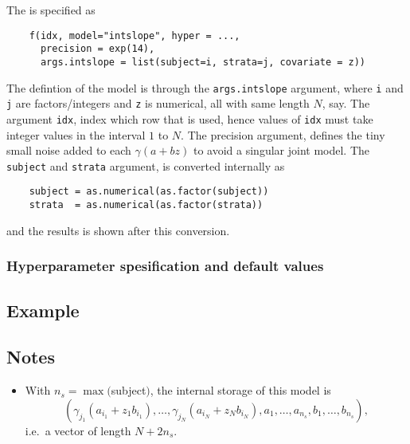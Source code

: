 \documentclass[a4paper,11pt]{article}
\begin{document}
The is specified as
\begin{verbatim}
    f(idx, model="intslope", hyper = ...,
      precision = exp(14),
      args.intslope = list(subject=i, strata=j, covariate = z))
\end{verbatim}
The defintion of the model is through the \verb|args.intslope|
argument, where \verb|i| and \verb|j| are factors/integers and
\verb|z| is numerical, all with same length $N$, say. The argument
\verb|idx|, index which row that is used, hence values of \verb|idx|
must take integer values in the interval $1$ to $N$. The precision
argument, defines the tiny small noise added to each $\gamma(a+bz)$ to
avoid a singular joint model. The \verb|subject| and \verb|strata|
argument, is converted internally as
\begin{verbatim}
    subject = as.numerical(as.factor(subject))
    strata  = as.numerical(as.factor(strata))
\end{verbatim}
and the results is shown after this conversion.


\subsubsection*{Hyperparameter spesification and default values}
{\small

}

\clearpage
\subsection*{Example}
{\small}

\subsection*{Notes}
\begin{itemize}
\item With $n_s=\max($subject$)$, the internal storage of this model
    is
    \begin{displaymath}
        \left(\gamma_{j_1} (a_{i_1} + z_{1}b_{i_{1}}), \ldots, 
        \gamma_{j_N} (a_{i_N} + z_{N}b_{i_N}), 
        a_1, \ldots, a_{n_s}, b_1, \ldots, b_{n_s}\right),
    \end{displaymath}
    i.e.\ a vector of length $N+2n_s$.
\end{itemize}
\end{document}

